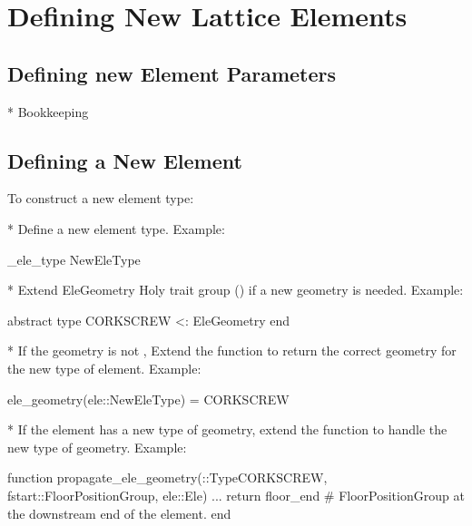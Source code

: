 \chapter{Defining New Lattice Elements}
\label{c:new.ele}

\section{Defining new Element Parameters}

* Bookkeeping 

\section{Defining a New Element}
\label{s:new.ele}

To construct a new element type:

* Define a new element type. Example:
\begin{example}
  \@construct_ele_type NewEleType
\end{example}

* Extend EleGeometry Holy trait group () if a new geometry is needed. Example:
\begin{example}
  abstract type CORKSCREW <: EleGeometry end
\end{example}

* If the geometry is not , Extend the  function to return the 
correct geometry for the new type of element. Example:
\begin{example}
  ele_geometry(ele::NewEleType) = CORKSCREW
\end{example}

* If the element has a new type of geometry, extend the  function
to handle the new type of geometry. Example:
\begin{example}
  function propagate_ele_geometry(::Type{CORKSCREW}, fstart::FloorPositionGroup, ele::Ele)
    ...
    return floor_end  # FloorPositionGroup at the downstream end of the element.
  end
\end{example}



